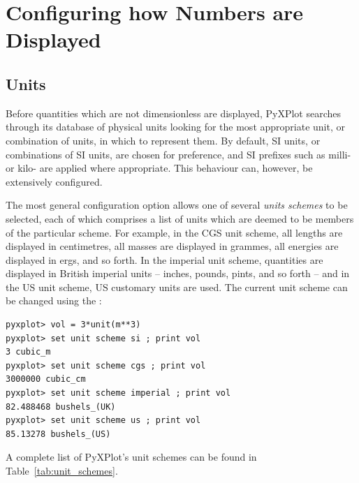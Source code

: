 \section{Configuring how Numbers are Displayed}
\label{sec:unitdisp}

\subsection{Units}

Before quantities which are not dimensionless are displayed, PyXPlot searches
through its database of physical units looking for the most appropriate unit,
or combination of units, in which to represent them.  By default, SI units, or
combinations of SI units, are chosen for preference, and SI prefixes such as
milli- or kilo- are applied where appropriate. This behaviour can, however, be
extensively configured.

The most general configuration option allows one of several {\it units
schemes} to be selected, each of which comprises a
list of units which are deemed to be members of the particular scheme. For
example, in the CGS unit scheme, all lengths
are displayed in centimetres, all masses are displayed in grammes, all energies
are displayed in ergs, and so forth.  In the imperial unit
scheme, quantities are displayed in
British imperial units -- inches, pounds, pints, and so forth -- and in the US
unit scheme, US customary units are used. The current unit scheme can be
changed using the :
\begin{verbatim}
pyxplot> vol = 3*unit(m**3)
pyxplot> set unit scheme si ; print vol
3 cubic_m
pyxplot> set unit scheme cgs ; print vol
3000000 cubic_cm
pyxplot> set unit scheme imperial ; print vol
82.488468 bushels_(UK)
pyxplot> set unit scheme us ; print vol
85.13278 bushels_(US)
\end{verbatim}

\noindent A complete list of PyXPlot's unit schemes can be found in
Table~\ref{tab:unit_schemes}.

